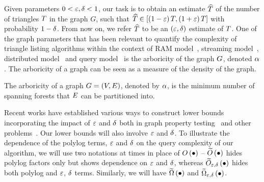 Given parameters $0 < \varepsilon, \delta < 1$, our task is to obtain an estimate $\widehat{T}$ of the number of triangles $T$ in the graph $G$, such that $\widehat{T} \in \left[{\left({1-\varepsilon}\right)T,\left({1+\varepsilon}\right)T}\right]$ with probability $1-\delta$. From now on, we refer $\widehat{T}$ to be an $\left({\varepsilon,\delta}\right)$ estimate of $T$. One of the graph parameters that has been relevant to quantify the complexity of triangle listing algorithms within the context of RAM model~\citep{DBLP:journals/siamcomp/ChibaN85}, streaming model~\citep{BeraSeshadriStreamingDegeneracy}, distributed model~\citep{JainSeshadriTuranWWW17, SuriVasCursedLastReducerWWW11, FinocchiMapreduceArboricityJExpAlg} and query model~\citep{DBLP:conf/approx/EdenR18} is the arboricity of the graph $G$, denoted $\alpha$. The arboricity of a graph can be seen as a measure of the density of the graph.
\begin{definition}
   The arboricity of a graph $G = (V,E)$, denoted by $\alpha$, is the minimum number of spanning forests that $E$ can be partitioned into.
\end{definition}
 

{} Recent works have established various ways to construct lower bounds incorporating the impact of $\varepsilon$ and $\delta$ both in graph property testing~\citep{DBLP:conf/approx/AssadiN22} and other problems~\citep{tetek:LIPIcs.ICALP.2022.107}. Our lower bounds will also involve $\varepsilon$ and $\delta$. To illustrate the dependence of the polylog terms, $\varepsilon$ and $\delta$ on the query complexity of our algorithm, we will use two notations at times in place of $O\left({{\bullet}}\right)$ -- $\widetilde{O}\left({{\bullet}}\right)$ hides polylog factors only but shows dependence on $\varepsilon$ and $\delta$, whereas $\widetilde{O}_{\varepsilon,\delta}\left({{\bullet}}\right)$ hides both polylog and $\varepsilon$, $\delta$ terms. Similarly, we will have $\widetilde{\Omega}\left({{\bullet}}\right)$ and $\widetilde{\Omega}_{\varepsilon,\delta}\left({{\bullet}}\right)$.


